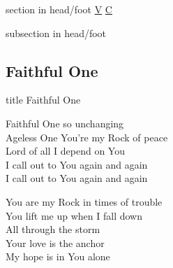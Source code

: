 \documentclass{beamer}
\begin{document}
{
{ 
 {
 \begin{beamercolorbox}[ht=4.5ex,dp=1.5ex,%
      leftskip=.3cm,rightskip=.3cm plus1fil]{section in head/foot}
 \fontsize{12}{25}\selectfont 
\hyperlink{Faithful One[]V}{V}
\hyperlink{Faithful One[]C}{C}
 
 \end{beamercolorbox}%
  \begin{beamercolorbox}[ht=2.5ex,dp=1.125ex,%
   leftskip=.3cm,rightskip=.3cm plus1fil]{subsection in head/foot}
   \insertauthor
 \end{beamercolorbox}%
 }
}
\subsection{ Faithful One }

\hypertarget{Faithful One[]}{}
\begin{frame}{}
 \vfill
  \centering
  \begin{beamercolorbox}[sep=8pt,center,shadow=true,rounded=true]{title}
    Faithful One     
  \end{beamercolorbox}
  \vfill
\end{frame}

\hypertarget{Faithful One[]V}{}
\begin{frame}{}
\fontsize{ 20 }{ 27 }\selectfont

Faithful One so unchanging\\ 
Ageless One You're my Rock of peace\\ 
Lord of all I depend on You\\ 
I call out to You again and again\\ 
I call out to You again and again 

\end{frame}

\hypertarget{Faithful One[]C}{}
\begin{frame}{}
\fontsize{ 20 }{ 27 }\selectfont

You are my Rock in times of trouble\\ 
You lift me up when I fall down\\ 
All through the storm\\ 
Your love is the anchor\\ 
My hope is in You alone 

\end{frame}

}
\end{document}
